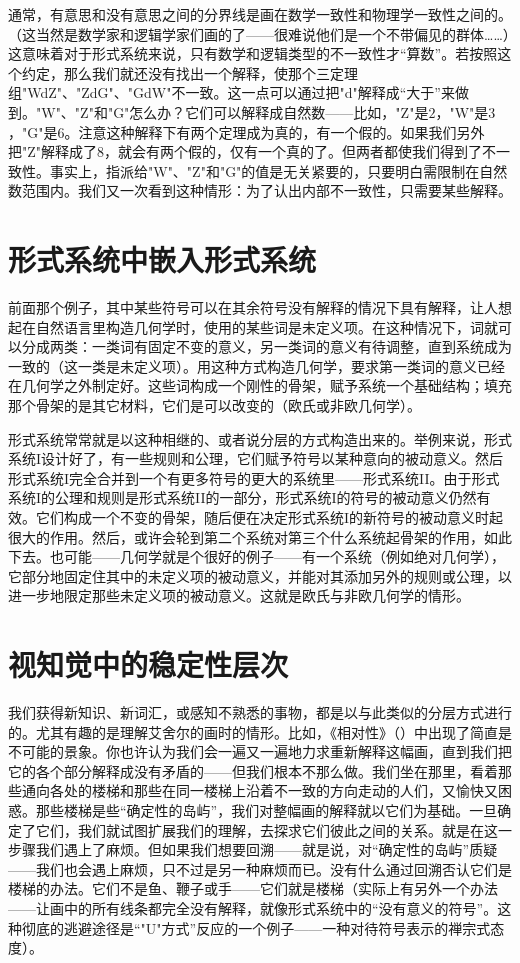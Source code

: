 通常，有意思和没有意思之间的分界线是画在数学一致性和物理学一致性之间的。（这当然是数学家和逻辑学家们画的了——很难说他们是一个不带偏见的群体……）这意味着对于形式系统来说，只有数学和逻辑类型的不一致性才“算数”。若按照这个约定，那么我们就还没有找出一个解释，使那个三定理组"WdZ"、"ZdG"、"GdW"不一致。这一点可以通过把"d"解释成“大于”来做到。"W"、"Z"和"G"怎么办？它们可以解释成自然数——比如，"Z"是$2$，"W"是$3$，"G"是$6$。注意这种解释下有两个定理成为真的，有一个假的。如果我们另外把"Z"解释成了$8$，就会有两个假的，仅有一个真的了。但两者都使我们得到了不一致性。事实上，指派给"W"、"Z"和"G"的值是无关紧要的，只要明白需限制在自然数范围内。我们又一次看到这种情形：为了认出内部不一致性，只需要某些解释。

\section{形式系统中嵌入形式系统}

前面那个例子，其中某些符号可以在其余符号没有解释的情况下具有解释，让人想起在自然语言里构造几何学时，使用的某些词是未定义项。在这种情况下，词就可以分成两类：一类词有固定不变的意义，另一类词的意义有待调整，直到系统成为一致的（这一类是未定义项）。用这种方式构造几何学，要求第一类词的意义已经在几何学之外制定好。这些词构成一个刚性的骨架，赋予系统一个基础结构；填充那个骨架的是其它材料，它们是可以改变的（欧氏或非欧几何学）。

形式系统常常就是以这种相继的、或者说分层的方式构造出来的。举例来说，形式系统I设计好了，有一些规则和公理，它们赋予符号以某种意向的被动意义。然后形式系统I完全合并到一个有更多符号的更大的系统里——形式系统II。由于形式系统I的公理和规则是形式系统II的一部分，形式系统I的符号的被动意义仍然有效。它们构成一个不变的骨架，随后便在决定形式系统I的新符号的被动意义时起很大的作用。然后，或许会轮到第二个系统对第三个什么系统起骨架的作用，如此下去。也可能——几何学就是个很好的例子——有一个系统（例如绝对几何学），它部分地固定住其中的未定义项的被动意义，并能对其添加另外的规则或公理，以进一步地限定那些未定义项的被动意义。这就是欧氏与非欧几何学的情形。

\section{视知觉中的稳定性层次}

我们获得新知识、新词汇，或感知不熟悉的事物，都是以与此类似的分层方式进行的。尤其有趣的是理解艾舍尔的画时的情形。比如，《相对性》（）中出现了简直是不可能的景象。你也许认为我们会一遍又一遍地力求重新解释这幅画，直到我们把它的各个部分解释成没有矛盾的——但我们根本不那么做。我们坐在那里，看着那些通向各处的楼梯和那些在同一楼梯上沿着不一致的方向走动的人们，又愉快又困惑。那些楼梯是些“确定性的岛屿”，我们对整幅画的解释就以它们为基础。一旦确定了它们，我们就试图扩展我们的理解，去探求它们彼此之间的关系。就是在这一步骤我们遇上了麻烦。但如果我们想要回溯——就是说，对“确定性的岛屿”质疑——我们也会遇上麻烦，只不过是另一种麻烦而已。没有什么通过回溯否认它们是楼梯的办法。它们不是鱼、鞭子或手——它们就是楼梯（实际上有另外一个办法——让画中的所有线条都完全没有解释，就像形式系统中的“没有意义的符号”。这种彻底的逃避途径是“"U"方式”反应的一个例子——一种对待符号表示的禅宗式态度）。

